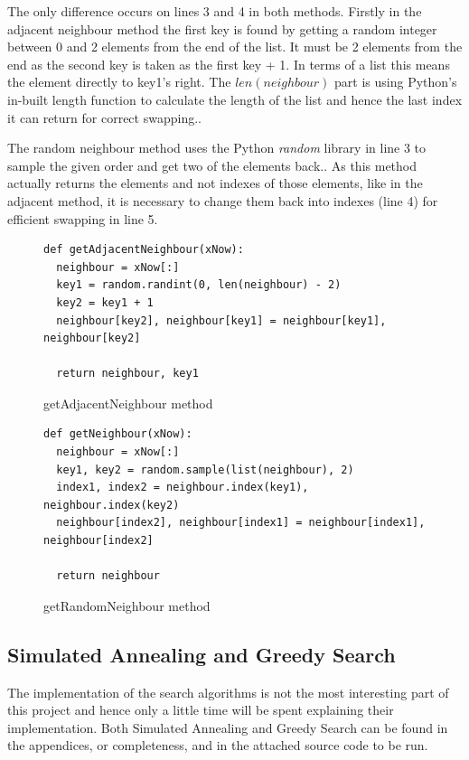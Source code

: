 \documentclass[12pt]{report}
\begin{document}
The only difference occurs on lines 3 and 4 in both methods. Firstly in the adjacent neighbour method the first key is found by getting a random integer between 0 and 2 elements from the end of the list. It must be 2 elements from the end as the second key is taken as the first key + 1. In terms of a list this means the element directly to key1's right. The $len(neighbour)$ part is using Python's in-built length function to calculate the length of the list and hence the last index it can return for correct swapping.\cite{PythonLen}.

The random neighbour method uses the Python \textit{random} library in line 3 to sample the given order and get two of the elements back.\cite{PythonSample}. As this method actually returns the elements and not indexes of those elements, like in the adjacent method, it is necessary to change them back into indexes (line 4) for efficient swapping in line 5.

\begin{figure}[H]
\caption{getAdjacentNeighbour method}
\label{adjacentNeighbour}
\begin{lstlisting}
def getAdjacentNeighbour(xNow):
  neighbour = xNow[:]
  key1 = random.randint(0, len(neighbour) - 2)
  key2 = key1 + 1
  neighbour[key2], neighbour[key1] = neighbour[key1], neighbour[key2]
    
  return neighbour, key1
\end{lstlisting}
\end{figure}

\begin{figure}[H]
\caption{getRandomNeighbour method}
\label{randomNeighbour}
\begin{lstlisting}
def getNeighbour(xNow):
  neighbour = xNow[:]
  key1, key2 = random.sample(list(neighbour), 2)
  index1, index2 = neighbour.index(key1), neighbour.index(key2)
  neighbour[index2], neighbour[index1] = neighbour[index1], neighbour[index2]
    
  return neighbour
\end{lstlisting}
\end{figure}

\subsection{Simulated Annealing and Greedy Search}\label{Imp-searchAlgos}
The implementation of the search algorithms is not the most interesting part of this project and hence only a little time will be spent explaining their implementation. Both Simulated Annealing and Greedy Search can be found in the appendices, or completeness, and in the attached source code to be run.
\end{document}
